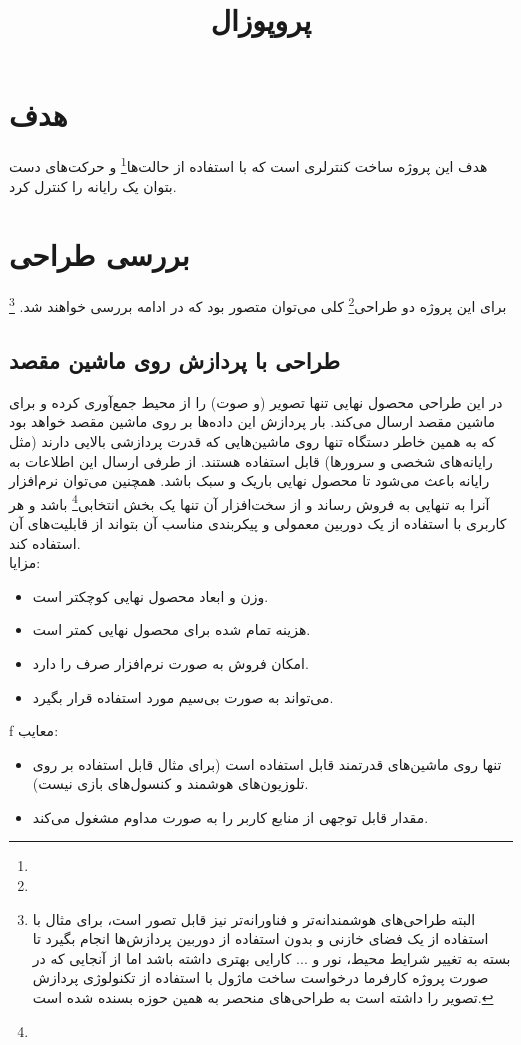 \documentclass{article}
\title{پروپوزال}
\begin{document}
\heading
\header
\allowdisplaybreaks
\tableofcontents
\pagebreak

\section{هدف}
هدف این پروژه ساخت کنترلری است که با استفاده از حالت‌ها\footnote{} و حرکت‌های دست بتوان
یک رایانه‌ را کنترل کرد. 

\section{بررسی طراحی}
برای این پروژه دو طراحی\footnote{} کلی می‌توان متصور بود که در ادامه بررسی خواهند شد. \footnote{البته‌ طراحی‌های هوشمندانه‌تر و فناورانه‌تر نیز قابل تصور است، برای مثال با استفاده از یک فضای خازنی و بدون استفاده از دوربین پردازش‌ها انجام بگیرد تا بسته به تغییر شرایط محیط، نور و ... کارایی بهتری داشته باشد اما از آنجایی که در صورت پروژه کارفرما درخواست ساخت ماژول با استفاده از تکنولوژی پردازش تصویر را داشته است به طراحی‌های منحصر به همین حوزه بسنده شده است.}

\subsection{طراحی با پردازش روی ماشین مقصد}
	در این طراحی محصول نهایی تنها تصویر (و صوت) را از محیط جمع‌آوری کرده و
	برای ماشین مقصد ارسال می‌کند. بار پردازش این داده‌ها بر روی ماشین مقصد خواهد بود که به همین خاطر دستگاه تنها روی ماشین‌هایی که قدرت  پردازشی بالایی دارند (مثل رایانه‌های شخصی و سرورها) قابل استفاده هستند. از طرفی ارسال این اطلاعات به رایانه باعث می‌شود تا محصول نهایی باریک و سبک باشد. همچنین می‌توان نرم‌افزار آنرا به تنهایی به فروش رساند و از سخت‌افزار آن تنها یک بخش انتخابی\footnote{} باشد و هر کاربری با استفاده از یک دوربین معمولی و پیکربندی
	مناسب آن بتواند از قابلیت‌های آن استفاده کند.
\\
	مزایا:
	\begin{itemize}
		\item وزن و ابعاد محصول نهایی کوچکتر است.
		\item هزینه تمام شده برای محصول نهایی کمتر است.
		\item امکان فروش به صورت نرم‌افزار صرف را دارد.
		\item می‌تواند به صورت بی‌سیم مورد استفاده قرار بگیرد.
	\end{itemize}f
	معایب:
	\begin{itemize}
		\item تنها روی ماشین‌های قدرتمند قابل استفاده است (برای مثال قابل استفاده بر روی تلوزیون‌های هوشمند و کنسول‌های بازی نیست).
		\item مقدار قابل توجهی از منابع کاربر را به صورت مداوم مشغول می‌کند.
	\end{itemize}
	
\end{document}
